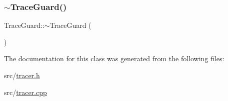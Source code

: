 \subsubsection{\texorpdfstring{$\sim$\+Trace\+Guard()}{~TraceGuard()}}
{\footnotesize\ttfamily Trace\+Guard\+::$\sim$\+Trace\+Guard (\begin{DoxyParamCaption}{ }\end{DoxyParamCaption})}



The documentation for this class was generated from the following files\+:\begin{DoxyCompactItemize}
\item 
src/\hyperlink{tracer_8h}{tracer.\+h}\item 
src/\hyperlink{tracer_8cpp}{tracer.\+cpp}\end{DoxyCompactItemize}
